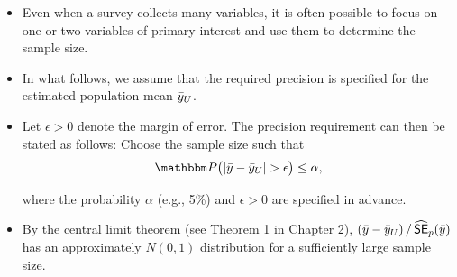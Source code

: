 \documentclass{my_eth_beamer}
\numberwithin{equation}{section}
\begin{document}
\begin{frame}
    \begin{itemize}
    \setlength{\itemsep}{10pt}
        \item Even when a survey collects \alert{many variables}, it is often
            possible to focus on one or two variables of \alert{primary
            interest} and use them to determine the sample size.
        \item In what follows, we assume that the required precision is
            specified for the estimated \alert{population mean} $\bar{y}_U$.
        \item Let $\epsilon > 0$ denote the \alert{margin of error}. The
            precision requirement can then be stated as follows:
            \alert{Choose the sample size such that}
            \begin{equation}\label{eq:srs_abs_err}
                \PP\big(\vert \mys - \myu \vert > \epsilon \big) \leq \alpha,
            \end{equation}

            \vspace{-0.25em}

            \noindent where the probability $\alpha$ (e.g., 5\%) and
            $\epsilon > 0$ are specified in advance.
        \item By the \alert{central limit theorem} (see Theorem 1 in Chapter
            2), $(\bar{y} - \bar{y}_U) \, / \, \widehat{\mathsf{SE}}_p(\bar{y})$ has an
            approximately $N(0,1)$ distribution for a sufficiently large
            sample size.
    \end{itemize}
\end{frame}
\end{document}
